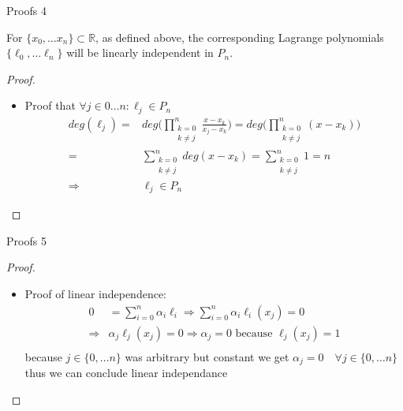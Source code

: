 \documentclass[8pt]{beamer}
\begin{document}
		\begin{frame}{Proofs 4}
			\begin{theorem}
				For $\{x_0, \ldots x_n \}\subset \mathbb{R}$, as defined above, the corresponding Lagrange polynomials $\{\ell_0, \ldots \ell_n \}$ will be linearly independent in $P_n$.
			\end{theorem}
			\begin{proof}
				\begin{itemize}
					\item 
					Proof that $\forall j \in 0\ldots n: \ell_j \in P_n$\\
					\begin{align*}
						\displaystyle deg(\ell_j) =& deg\bigg(\prod_{\substack{k= 0 \\ k \neq j }}^{n}\frac{x - x_k}{x_j - x_k}\bigg) =deg\bigg( \prod_{\substack{k= 0 \\ k \neq j }}^{n}(x-x_k)\bigg) \\=& \sum_{\substack{k= 0 \\ k \neq j }}^{n} deg(x-x_k) = \sum_{\substack{k= 0 \\ k \neq j }}^{n} 1 = n\\
						\Rightarrow& \ell_j \in P_n
					\end{align*}
				
				\end{itemize}
			\end{proof}
		\end{frame}
		\begin{frame}{Proofs 5}
			\begin{proof}
				\begin{itemize}
					\item Proof of linear independence:\\
					\begin{align*}
						0 &= \sum_{i = 0}^{n}\alpha_i\ell_i \Rightarrow \sum_{i = 0}^{n}\alpha_i\ell_i(x_j) = 0\\
						\Rightarrow & \alpha_j\ell_j(x_j) = 0 \Rightarrow \alpha_j = 0 \text{ because $\ell_j(x_j) = 1$}\\
					\end{align*}
					because $j \in \{0, \ldots n\}$ was arbitrary but constant we get $\alpha_j = 0 \quad \forall j \in \{0, \ldots n\}$\\
					thus we can conclude linear independance 
				\end{itemize}
			\end{proof}
		\end{frame}
									
\end{document}
